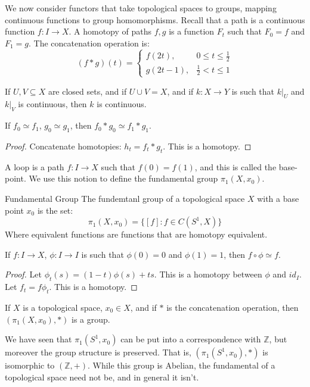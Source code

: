 \documentclass{book}                                                           %
\begin{document}
    We now consider functors that take topological spaces to
    groups, mapping continuous functions to group homomorphisms.
    Recall that a path is a continuous function $f:I\rightarrow{X}$.
    A homotopy of paths $f,g$ is a function $F_{t}$ such that
    $F_{0}=f$ and $F_{1}=g$. The concatenation operation is:
    \begin{equation}
        (f*g)(t)=
        \begin{cases}
            f(2t),&0\leq{t}\leq\frac{1}{2}\\
            g(2t-1),&\frac{1}{2}<t\leq{1}
        \end{cases}
    \end{equation}
    \begin{theorem}
        If $U,V\subseteq{X}$ are closed sets, and if
        $U\cup{V}=X$, and if $k:X\rightarrow{Y}$ is such that
        $k|_{U}$ and $k|_{V}$ is continuous, then $k$ is continuous.
    \end{theorem}
    \begin{theorem}
        If $f_{0}\simeq{f}_{1}$, $g_{0}\simeq{g}_{1}$, then
        $f_{0}*g_{0}\simeq{f}_{1}*g_{1}$.
    \end{theorem}
    \begin{proof}
        Concatenate homotopies: $h_{t}=f_{t}*g_{t}$. This is a
        homotopy.
    \end{proof}
    A loop is a path $f:I\rightarrow{X}$ such that $f(0)=f(1)$, and
    this is called the base-point. We use this notion to define the
    fundamental group $\pi_{1}(X,x_{0})$.
    \begin{ldefinition}{Fundamental Group}
        The fundemtanl group of a topological space $X$ with a
        base point $x_{0}$ is the set:
        \begin{equation}
            \pi_{1}(X,x_{0})=\{[f]:f\in{C}(S^{1},X)\}
        \end{equation}
        Where equivalent functions are functions that are homotopy
        equivalent.
    \end{ldefinition}
    \begin{theorem}
        If $f:I\rightarrow{X}$, $\phi:I\rightarrow{I}$ is such that
        $\phi(0)=0$ and $\phi(1)=1$, then $f\circ\phi\simeq{f}$.
    \end{theorem}
    \begin{proof}
        Let $\phi_{t}(s)=(1-t)\phi(s)+ts$. This is a homotopy between
        $\phi$ and $id_{I}$. Let $f_{t}=f\phi_{t}$. This is a
        homotopy.
    \end{proof}
    \begin{theorem}
        If $X$ is a topological space, $x_{0}\in{X}$, and if
        $*$ is the concatenation operation, then
        $(\pi_{1}(X,x_{0}),*)$ is a group.
    \end{theorem}
    \begin{example}
        We have seen that $\pi_{1}(S^{1},x_{0})$ can be put into
        a correspondence with $\mathbb{Z}$, but moreover the
        group structure is preserved. That is,
        $(\pi_{1}(S^{1},x_{0}),*)$ is isomorphic to
        $(\mathbb{Z},+)$. While this group is Abelian,
        the fundamental of a topological space need not be, and
        in general it isn't.
    \end{example}
\end{document}
